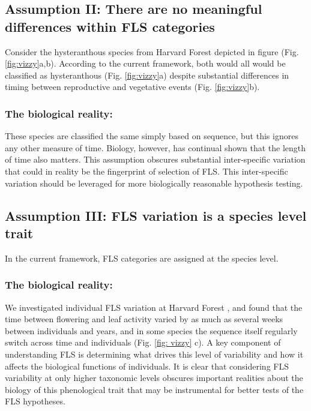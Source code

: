 \documentclass{article}
\begin{document}
{\subsection*{Assumption II: There are no meaningful differences within FLS categories}
 Consider the hysteranthous species from Harvard Forest depicted in figure (Fig. \ref{fig:vizzy}a,b). According to the current framework, both would all would be classified as hysteranthous (Fig. \ref{fig:vizzy}a) despite substantial differences in timing between reproductive and vegetative events (Fig. \ref{fig:vizzy}b).
\subsubsection*{The biological reality:}
These species are classified the same simply based on sequence, but this ignores any other measure of time. Biology, however, has continual shown that the length of time also matters\citep{Inouye2019}. This assumption obscures substantial inter-specific variation that could in reality be the fingerprint of selection of FLS. This inter-specific variation should be leveraged for more biologically reasonable hypothesis testing.

\subsection*{Assumption III: FLS variation is a species level trait}
In the current framework, FLS categories are assigned at the species level.
\subsubsection*{The biological reality:}
We investigated individual FLS variation at Harvard Forest \citep{OKeefe2015}, and found that the time between flowering and leaf activity varied by as much as several weeks between individuals and years, and in some species the sequence itself regularly switch across time and individuals  (Fig. \ref{fig: vizzy} c). A key component of understanding FLS is determining what drives this level of variability and how it affects the biological functions of individuals. It is clear that considering FLS variability at only higher taxonomic levels obscures important realities about the biology of this phenological trait that may be instrumental for better tests of the FLS hypotheses.\\

}
\end{document}
